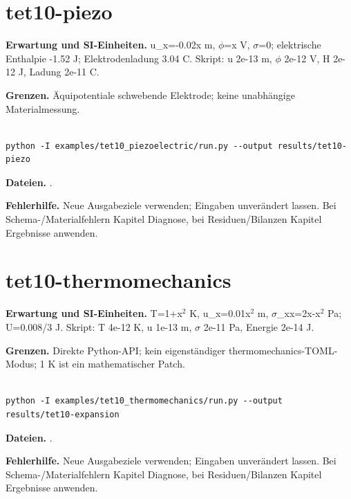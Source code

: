 \section{tet10-piezo}\label{recipe:tet10-piezo}

\textbf{Erwartung und SI-Einheiten.} u\_x=-0.02x m, $\phi$=x V, $\sigma$=0; elektrische Enthalpie -1.52 J; Elektrodenladung 3.04 C. Skript: u 2e-13 m, $\phi$ 2e-12 V, H 2e-12 J, Ladung 2e-11 C.

\textbf{Grenzen.} Äquipotentiale schwebende Elektrode; keine unabhängige Materialmessung.

\begin{lstlisting}

python -I examples/tet10_piezoelectric/run.py --output results/tet10-piezo

\end{lstlisting}

\textbf{Dateien.} .

\textbf{Fehlerhilfe.} Neue Ausgabeziele verwenden; Eingaben unverändert lassen. Bei Schema-/Materialfehlern Kapitel Diagnose, bei Residuen/Bilanzen Kapitel Ergebnisse anwenden.



\section{tet10-thermomechanics}\label{recipe:tet10-thermomechanics}

\textbf{Erwartung und SI-Einheiten.} T=1+x$^2$ K, u\_x=0.01x$^2$ m, $\sigma$\_xx=2x-x$^2$ Pa; U=0.008/3 J. Skript: T 4e-12 K, u 1e-13 m, $\sigma$ 2e-11 Pa, Energie 2e-14 J.

\textbf{Grenzen.} Direkte Python-API; kein eigenständiger thermomechanics-TOML-Modus; 1 K ist ein mathematischer Patch.

\begin{lstlisting}

python -I examples/tet10_thermomechanics/run.py --output results/tet10-expansion

\end{lstlisting}

\textbf{Dateien.} .

\textbf{Fehlerhilfe.} Neue Ausgabeziele verwenden; Eingaben unverändert lassen. Bei Schema-/Materialfehlern Kapitel Diagnose, bei Residuen/Bilanzen Kapitel Ergebnisse anwenden.

